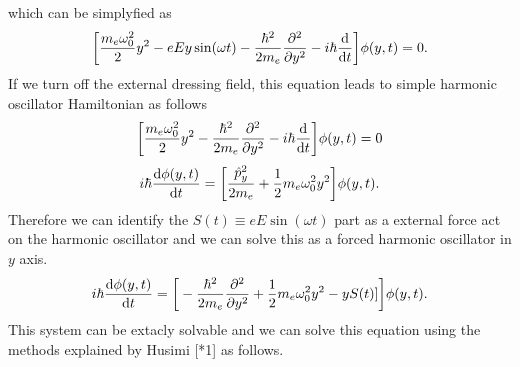 \documentclass[a4paper]{article}
\numberwithin{equation}{subsection}
\numberwithin{equation}{section}
\begin{document}
which can be simplyfied as
\begin{equation} \label{1.29}
  \begin{aligned}
    \bigg[
    \frac{m_e \omega_0^2}{2}y^2
    - {eEy}\sin(\omega t)
    -
    \frac{\hbar^2}{2m_e}
    \pdv[2]{y}
    - i \hbar \dv{t}
    \bigg]
    \phi(y,t) = 0.
  \end{aligned}
\end{equation}
If we turn off the external dressing field, this equation leads to simple harmonic oscillator Hamiltonian as follows
\begin{equation} \label{1.30}
  \begin{aligned}
    \bigg[
    \frac{m_e \omega_0^2}{2}y^2
    -
    \frac{\hbar^2}{2m_e}
    \pdv[2]{y}
    - i \hbar \dv{t}
    \bigg]
    \phi(y,t) = 0
  \end{aligned}
\end{equation}
\begin{equation} \label{1.31}
  \begin{aligned}
     i \hbar \dv{\phi(y,t)}{t} =
    \bigg[
    \frac{\hat{p}_y^2}{2m_e} +
    \frac{1}{2}m_e \omega_0^2y^2
    \bigg]
    \phi(y,t).
  \end{aligned}
\end{equation}
Therefore we can identify the $S(t) \equiv eE\sin(\omega t)$ part as a external force act on the harmonic oscillator and we can solve this as a forced harmonic oscillator in $y$ axis.
\begin{equation} \label{1.32}
  \begin{aligned}
    i \hbar \dv{\phi(y,t)}{t} =
    \bigg[
    -
    \frac{\hbar^2}{2m_e}
    \pdv[2]{y} +
    \frac{1}{2}m_e \omega_0^2y^2
    - yS(t)]
    \bigg]
    \phi(y,t).
  \end{aligned}
\end{equation}
This system can be extacly solvable and we can solve this equation using the methods explained by Husimi [*1] as follows.
\end{document}
